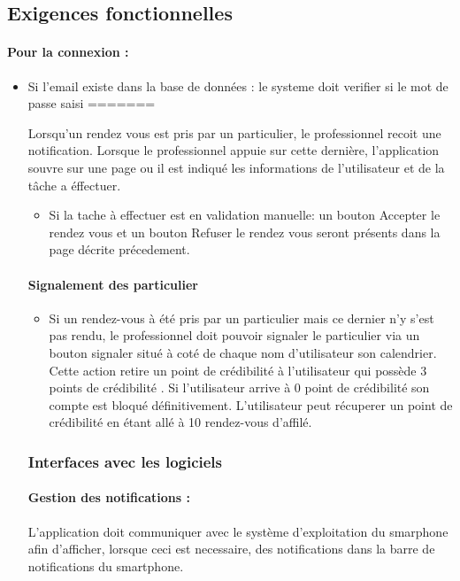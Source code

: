 \documentclass{article}
\begin{document}
\begin{itemize}
\subsection{Exigences fonctionnelles}
\paragraph{Pour la connexion : }

\begin{itemize}
\item Si l'email existe dans la base de données :
	le systeme doit verifier si le mot de passe saisi
=======


Lorsqu'un rendez vous est pris par un particulier, le
  professionnel recoit une notification. Lorsque le professionnel
  appuie sur cette dernière, l'application souvre sur une page ou il
  est indiqué les informations de l'utilisateur et de la tâche a éffectuer.
\begin{itemize}
\item  Si la tache à effectuer est en validation manuelle: un bouton \og
  Accepter le rendez vous \fg{} et un bouton \og
  Refuser le rendez vous \fg{} seront présents dans la page décrite précedement.
\end{itemize}
\paragraph{Signalement des particulier}
\begin{itemize}
\item Si un rendez-vous à été pris par un particulier mais ce dernier
  n'y s'est pas rendu, le professionnel doit pouvoir
  signaler le particulier via un bouton \og signaler \fg{} situé
  à coté de chaque nom d'utilisateur son calendrier. Cette action retire un \og point de crédibilité \fg{} à l'utilisateur qui possède
  3 \og points de crédibilité \fg{}. Si l'utilisateur arrive à 0 point de crédibilité son compte est
  bloqué définitivement. L'utilisateur peut récuperer un point de crédibilité  en étant
  allé à 10 rendez-vous d'affilé.
\end{itemize}

\subsubsection{Interfaces avec les logiciels}
\paragraph{Gestion des notifications :}
L'application doit communiquer avec le système d'exploitation du
smarphone afin d'afficher, lorsque ceci est necessaire, des
notifications dans la barre de notifications du smartphone.


\end{itemize}
\end{itemize}
\end{document}
